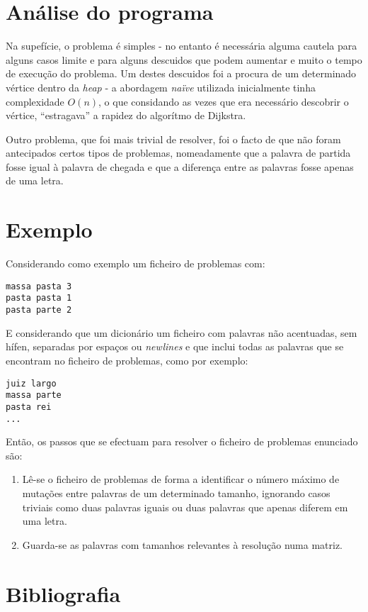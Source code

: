 \documentclass[a4paper, 11pt]{article}
\begin{document}
\section{Análise do programa}
    \par Na supefície, o problema é simples - no entanto é necessária alguma cautela para alguns casos limite e para alguns descuidos que podem aumentar e muito o tempo de execução do problema. Um destes descuidos foi a procura de um determinado vértice dentro da \textit{heap} - a abordagem \textit{naïve} utilizada inicialmente tinha complexidade $O(n)$, o que considando as vezes que era necessário descobrir o vértice, ``estragava'' a rapidez do algorítmo de Dijkstra.
    \par Outro problema, que foi mais trivial de resolver, foi o facto de que não foram antecipados certos tipos de problemas, nomeadamente que a palavra de partida fosse igual à palavra de chegada e que a diferença entre as palavras fosse apenas de uma letra.

\section{Exemplo}
    \par Considerando como exemplo um ficheiro de problemas com:
        \begin{center}
        \texttt{massa pasta 3 \\
        pasta pasta 1 \\
        pasta parte 2 \\
        }
        \end{center}
        
    \par E considerando que um dicionário um ficheiro com palavras não acentuadas, sem hífen, separadas por espaços ou \textit{newlines} e que inclui todas as palavras que se encontram no ficheiro de problemas, como por exemplo: 
        \begin{center}
        \texttt{juiz largo \\
        massa parte \\
        pasta rei \\
        ...}
        \end{center}
        
    \par Então, os passos que se efectuam para resolver o ficheiro de problemas enunciado são:
    
    \begin{enumerate}[align=left]
        \item Lê-se o ficheiro de problemas de forma a identificar o número máximo de mutações entre palavras de um determinado tamanho, ignorando casos triviais como duas palavras iguais ou duas palavras que apenas diferem em uma letra.
        \item Guarda-se as palavras com tamanhos relevantes à resolução numa matriz.
    \end{enumerate}

\section{Bibliografia}
\end{document}

